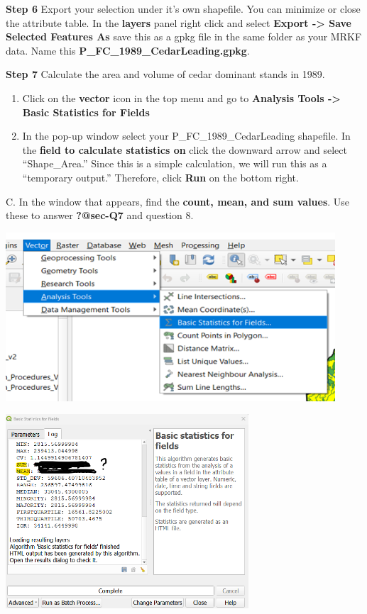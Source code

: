 \documentclass[
  letterpaper,
]{book}
\begin{document}
\textbf{Step 6} Export your selection under it's own shapefile. You can
minimize or close the attribute table. In the \textbf{layers} panel
right click and select \textbf{Export -\textgreater{} Save Selected
Features As} save this as a gpkg file in the same folder as your MRKF
data. Name this \textbf{P\_FC\_1989\_CedarLeading.gpkg}.

\textbf{Step 7} Calculate the area and volume of cedar dominant stands
in 1989.

\begin{enumerate}
\def\labelenumi{\Alph{enumi}.}
\item
  Click on the \textbf{vector} icon in the top menu and go to
  \textbf{Analysis Tools -\textgreater{} Basic Statistics for Fields}
\item
  In the pop-up window select your P\_FC\_1989\_CedarLeading shapefile.
  In the \textbf{field to calculate statistics on} click the downward
  arrow and select ``Shape\_Area.'' Since this is a simple calculation,
  we will run this as a ``temporary output.'' Therefore, click
  \textbf{Run} on the bottom right.
\end{enumerate}

C. In the window that appears, find the \textbf{count, mean, and sum
values}. Use these to answer \textbf{?@sec-Q7} and question 8.

\includegraphics[width=4.83333in,height=\textheight]{images/clipboard-1197445832.png}

\includegraphics[width=3.5625in,height=\textheight]{images/clipboard-30022994.png}
\end{document}
